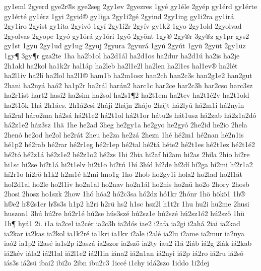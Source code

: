 {gy1eml
2gyerd
gye2r^^aes
gye2seg
2gy1ev
2gyezres
1gy^^e9
gy1^^e9le
2gy^^e9p
gy1^^e9rd
gy1^^e9rte
gy1^^e9rt^^e9
gy1^^e9rz
1gyi
2gyid^^ae
gy1iga
2gy1i2g^^e9
2gyind
2gy1ing
gy1i2ra
gy1ir^^e1
2gy1iro
2gyist
gy1ita
2gyiv^^f3
1gy^^ed
2gy1^^ed2r
2gy^^edv
gy1k2
1gyo
2gy1old
2gyolvad
2gyolvas
2gyope
1gy^^f3
gy1^^f3r^^e1
gy1^^f3ri
1gy^^f6
2gy^^f6nt
1gy^^ae
2gy^^aer
3gy^^aez
gy1pr
gys2
gy1st
1gyu
2gy1ud
gy1ug
2gyuj
2gyura
2gyur^^e1
1gy^^fa
2gy^^fat
1gy^^fc
2gy^^fct
2gy1^^fcz
1gy^^b6
3gy^^b6r
gza2te
1ha
ha2b1ol
ha2d1^^e1l
ha2d1os
ha2dur
ha2d1^^fa
ha2is
ha2je
2h1akl
ha2kol
ha1k2r
hal1^^e1p
ha2leb
ha2l1e2l
ha2len
ha2l1es
hal1ev^^ae
ha2l^^e9t
ha2l1iv
ha2l^^ed
ha2lol
ha2l1^^ae
ham1b
ha2m1osz
han2ch
han2c3s
han2g1e2
han2gut
2hani
ha2ny^^e1
ha^^f32
ha1p2r
ha2r^^e1l
har^^e1n2
harc1c
har2ce
har2c3h
har2cso
harc3sz
ha2r1ist
hart2
hasi2
ha2sim
ha2sol
ha2s1^^b62
ha2t1em
ha2tev
ha2t1^^e92v
ha2t1old
ha2t1^^f6k
1h^^e1
2h1^^e1cs.
2h1^^e12csi
2h^^e1ji
2h^^e1jn
2h^^e1jo
2h^^e1jt
h^^e12ly^^fa
h^^e12m1i
h^^e12nyin
h^^e12ral
h^^e1ro2ma
h^^e12s^^e1
h^^e12t1e2
h^^e12t1ol
h^^e12t1or
h^^e1tu2s
h^^e1t1usz
h^^e12zab
h^^e12z1a2d^^f3
h^^e12z1e2
h^^e1z3sz
1h^^e4
1he
he2ad
3heg
he2gy1a
he2gyo
he2gy^^f3
2he2id
he2io
2hela
2hen^^f3
he2od
he2ol
he2r^^e1t
2heu
he2za
he2z^^e1
2hezn
1h^^e9
h^^e92m1
h^^e92nan
h^^e92n1is
h^^e91p2
h^^e92rab
h^^e92rar
h^^e92r1eg
h^^e92r1ep
h^^e92tal
h^^e92t^^e1
h^^e9te2
h^^e92t1es
h^^e92t1ez
h^^e92t1^^e92
h^^e92t^^f3
h^^e92z1^^e1
h^^e92z1e2
h^^e92z1o2
h^^e92zs
1hi
2hia
hi2af
hi2am
hi2as
2hila
2hio
hi2re
hi1sc
hi2se
hi2t1^^e1
hi2t1elv
hi2t1o
hi2t^^fa
1h^^ed
3h^^edd
h^^ed2de
h^^ed2d^^ed
h^^ed2ga
h^^ed2mi
h^^ed2r1a2
h^^ed2r1o
h^^ed2r^^f6
h1k2
h2m1^^e9
h2mi
hno1g
1ho
2hob
ho2gy1i
hola2
ho2lad
ho2l1^^e1t
hol2d1al
ho2le
ho2l1iv
ho2n1al
ho2nav
ho2n1^^e1l
ho2nis
ho2n^^fc
ho2o
2hory
2hosb
2hosi
2hosz
ho1szk
2how
1h^^f3
h^^f3a2
h^^f32c3sa
h^^f32dz
h^^f31kr
2h^^f3nr
1h^^f6
h^^f6k^^f61
1h^^ae
h^^aee2
h^^ae2s1er
h^^aes3s
h1p2
h2ri
h2r^^fc
hs2
h1sc
hsz2l
h1t2r
1hu
hu2i
hu2me
2husi
huszon1
3h^^fa
h^^fa2re
h^^fa2r1^^e9
h^^fa2se
h^^fas3sz^^e9
h^^fa2sz1e
h^^fa2sz^^e9
h^^fa2sz1^^f32
h^^fa2sz^^f6
1h^^fc
1h^^b6
hy^^e11
2i.
i1a
ia2cel
ia2c^^e9r
ia2c3h
ia2d^^f3s
iae2
i2afa
ia2gi
i2ah^^e1
2iai
ia2kad
ia2kar
ia2kas
ia2kol
ia1k2r^^e9
ia1kri
ia1kv
i2ale
i2al^^e9
ia2lu
i2ame
ia2mur
ia2nya
ia^^f32
ia1p2
i2as^^e9
ia1s2p
i2asz^^e1
ia2szor
ia2sz^^f6
ia2ty
iau2
i1^^e1
2i^^e1b
i^^e12g
2i^^e1k
i^^e12kab
i^^e12k^^e9v
i^^e1la2
i^^e12l1al
i^^e12l1e2
i^^e12l1in
i^^e1na2
i^^e12n1an
i^^e12nyi
i^^e12p
i^^e12ro
i^^e12ru
i^^e12s^^f3
i^^e1s3s
i^^e12s^^fc
ibai2
ibi2o
2ibn
ibu2c3
1icc^^e9
i1chy
id^^e12szo
1iddo
1i2dej
}
